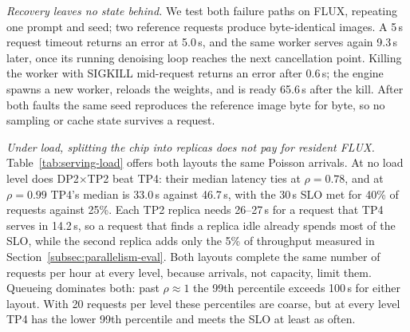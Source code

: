 \emph{Recovery leaves no state behind.} We test both failure paths on FLUX, repeating one prompt and seed; two reference requests produce byte-identical images. A 5\,s request timeout returns an error at 5.0\,s, and the same worker serves again 9.3\,s later, once its running denoising loop reaches the next cancellation point. Killing the worker with SIGKILL mid-request returns an error after 0.6\,s; the engine spawns a new worker, reloads the weights, and is ready 65.6\,s after the kill. After both faults the same seed reproduces the reference image byte for byte, so no sampling or cache state survives a request.

\emph{Under load, splitting the chip into replicas does not pay for resident FLUX.} Table~\ref{tab:serving-load} offers both layouts the same Poisson arrivals. At no load level does DP2$\times$TP2 beat TP4: their median latency ties at $\rho = 0.78$, and at $\rho = 0.99$ TP4's median is 33.0\,s against 46.7\,s, with the 30\,s SLO met for 40\% of requests against 25\%. Each TP2 replica needs 26--27\,s for a request that TP4 serves in 14.2\,s, so a request that finds a replica idle already spends most of the SLO, while the second replica adds only the 5\% of throughput measured in Section~\ref{subsec:parallelism-eval}. Both layouts complete the same number of requests per hour at every level, because arrivals, not capacity, limit them. Queueing dominates both: past $\rho \approx 1$ the 99th percentile exceeds 100\,s for either layout. With 20 requests per level these percentiles are coarse, but at every level TP4 has the lower 99th percentile and meets the SLO at least as often.
